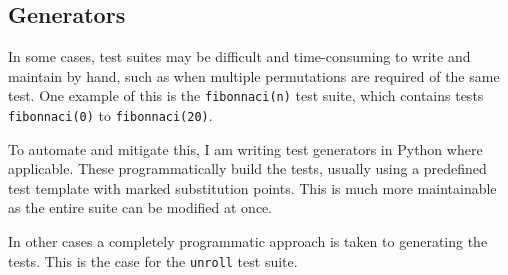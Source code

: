 \subsection{Generators}

In some cases, test suites may be difficult and time-consuming to write and maintain by hand, such as when multiple permutations are required of the same test. One example of this is the \texttt{fibonnaci(n)} test suite, which contains tests \texttt{fibonnaci(0)} to \texttt{fibonnaci(20)}.

To automate and mitigate this, I am writing test generators in Python where applicable. These programmatically build the tests, usually using a predefined test template with marked substitution points. This is much more maintainable as the entire suite can be modified at once.

In other cases a completely programmatic approach is taken to generating the tests. This is the case for the \texttt{unroll} test suite.